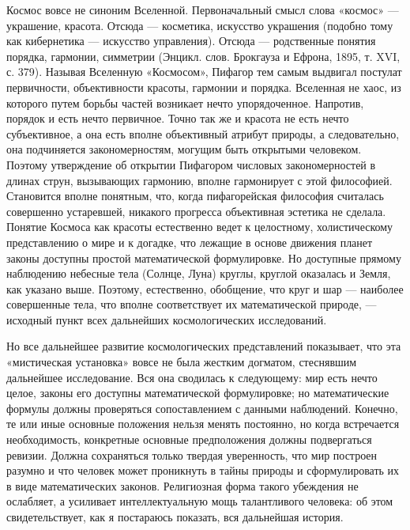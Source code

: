 Космос вовсе не синоним Вселенной. Первоначальный смысл слова «космос»
---  украшение, красота.  Отсюда  ---  косметика, искусство  украшения
(подобно  тому  как  кибернетика  ---  искусство  управления).  Отсюда
--- родственные  понятия порядка,  гармонии, симметрии  (Энцикл. слов.
Брокгауза  и  Ефрона,  1895,  т.   XVI,  с.  379).  Называя  Вселенную
«Космосом»,   Пифагор  тем   самым   выдвигал  постулат   первичности,
объективности  красоты,  гармонии и  порядка.  Вселенная  не хаос,  из
которого путем борьбы частей  возникает нечто упорядоченное. Напротив,
порядок  и   есть  нечто  первичное.   Точно  так  же  и   красота  не
есть  нечто  субъективное,  а  она  есть  вполне  объективный  атрибут
природы,  а следовательно,  она  подчиняется закономерностям,  могущим
быть открытыми  человеком. Поэтому  утверждение об  открытии Пифагором
числовых закономерностей  в длинах струн, вызывающих  гармонию, вполне
гармонирует с этой философией.  Становится вполне понятным, что, когда
пифагорейская  философия  считалась  совершенно  устаревшей,  никакого
прогресса объективная эстетика не сделала. Понятие Космоса как красоты
естественно ведет к целостному,  холистическому представлению о мире и
к  догадке,  что лежащие  в  основе  движения планет  законы  доступны
простой математической  формулировке. Но доступные  прямому наблюдению
небесные тела  (Солнце, Луна) круглы,  круглой оказалась и  Земля, как
указано  выше. Поэтому,  естественно, обобщение,  что круг  и шар  ---
наиболее совершенные тела, что  вполне соответствует их математической
природе,   ---   исходный   пункт  всех   дальнейших   космологических
исследований.

Но все  дальнейшее развитие космологических  представлений показывает,
что  эта  «мистическая  установка»  вовсе не  была  жестким  догматом,
стеснявшим дальнейшее  исследование. Вся  она сводилась  к следующему:
мир есть нечто целое, законы его доступны математической формулировке;
но математические формулы должны  проверяться сопоставлением с данными
наблюдений.  Конечно, те  или  иные основные  положения нельзя  менять
постоянно,  но когда  встречается  необходимость, конкретные  основные
предположения должны  подвергаться ревизии. Должна  сохраняться только
твердая  уверенность, что  мир построен  разумно и  что человек  может
проникнуть в тайны  природы и сформулировать их  в виде математических
законов. Религиозная форма такого  убеждения не ослабляет, а усиливает
интеллектуальную мощь талантливого  человека: об этом свидетельствует,
как я постараюсь показать, вся дальнейшая история.

